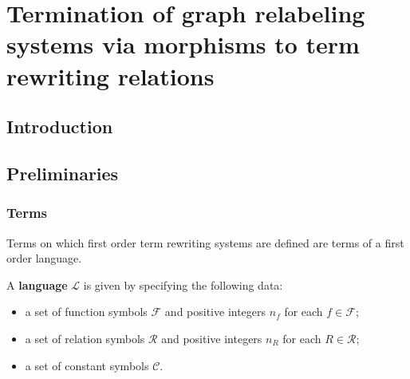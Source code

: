 \documentclass{book}
\begin{document}
\part{Termination of graph relabeling systems via morphisms to term rewriting relations}
\chapter{Introduction}

\chapter{Preliminaries}
    \label{sec:trs} 
    
\section{Terms}
Terms on which first order term rewriting systems are defined are terms of a first order language.
\begin{definition}
  A \textbf{language} \( \mathcal{L} \) is given by specifying the following data:
  \begin{itemize}
      \item  a set of function symbols \( \mathcal{F} \) and positive integers \( n_f \) for each \( f \in \mathcal{F} \);
      \item  a set of relation symbols \( \mathcal{R} \) and positive integers \( n_R \) for each \( R \in \mathcal{R} \);
      \item  a set of constant symbols \( \mathcal{C} \).
  \end{itemize}
\end{definition}
\end{document}
